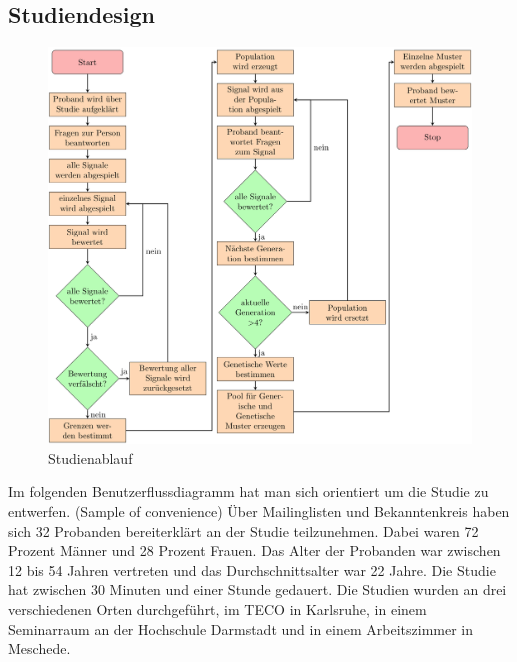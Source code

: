 

\subsection{Studiendesign}
\label{ch:Evolution{\"a}rer Algorithmus:sec:Studiendesign}

\begin{figure}
	\centering
    \includegraphics[width=\textwidth]{pics/analyse/Programmablaufdiagramm.png}
    \caption{Studienablauf}
    \label{fig:flussdiagramm}
\end{figure}

Im folgenden Benutzerflussdiagramm hat man sich orientiert um die Studie zu entwerfen. (Sample of convenience) {\"U}ber Mailinglisten und Bekanntenkreis haben sich 32 Probanden bereiterkl{\"a}rt an der Studie teilzunehmen. Dabei waren 72 Prozent M{\"a}nner und 28 Prozent Frauen. Das Alter der Probanden war zwischen 12 bis 54 Jahren vertreten und das Durchschnittsalter war 22 Jahre. Die Studie hat zwischen 30 Minuten und einer Stunde gedauert.
Die Studien wurden an drei verschiedenen Orten durchgef{\"u}hrt, im TECO in Karlsruhe, in einem Seminarraum an der Hochschule Darmstadt und in einem Arbeitszimmer in Meschede.

